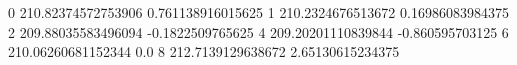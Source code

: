 0 210.82374572753906 0.761138916015625
1 210.2324676513672 0.16986083984375
2 209.88035583496094 -0.1822509765625
4 209.20201110839844 -0.860595703125
6 210.06260681152344 0.0
8 212.7139129638672 2.65130615234375
